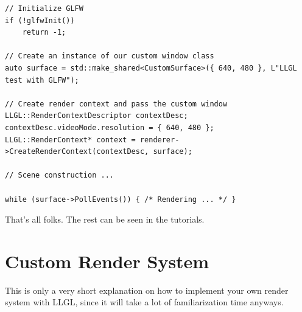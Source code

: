 \documentclass{article}
\begin{document}
\begin{lstlisting}
// Initialize GLFW
if (!glfwInit())
	return -1;

// Create an instance of our custom window class
auto surface = std::make_shared<CustomSurface>({ 640, 480 }, L"LLGL test with GLFW");

// Create render context and pass the custom window
LLGL::RenderContextDescriptor contextDesc;
contextDesc.videoMode.resolution = { 640, 480 };
LLGL::RenderContext* context = renderer->CreateRenderContext(contextDesc, surface);

// Scene construction ...

while (surface->PollEvents()) { /* Rendering ... */ }
\end{lstlisting}
That's all folks. The rest can be seen in the tutorials.



\newpage
\section{Custom Render System}
\label{sec:custom_renderer}

This is only a very short explanation on how to implement your own render system with LLGL,
since it will take a lot of familiarization time anyways.
\end{document}
